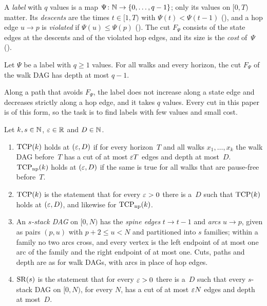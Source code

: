 A \emph{label} with $q$ values is a map $\Psi\colon\mathbb{N}\to\{0,\dots,q-1\}$; only its values on $[0,T)$ matter. Its
\emph{descents} are the times $t\in[1,T)$ with $\Psi(t)<\Psi(t-1)$ (), and a hop edge
$u\to p$ is \emph{violated} if $\Psi(u)\le\Psi(p)$ (). The cut $F_\Psi$ consists of the state
edges at the descents and of the violated hop edges, and its size is the \emph{cost} of~$\Psi$ ().

\begin{proposition}\label{prop:labelcut}
Let $\Psi$ be a label with $q\ge1$ values. For all walks and every horizon, the cut $F_\Psi$ of the walk DAG has depth at
most $q-1$.
\end{proposition}

Along a path that avoids $F_\Psi$, the label does not increase along a state edge and decreases strictly along a hop edge,
and it takes $q$ values. Every cut in this paper is of this form, so the task is to find labels with few values and small
cost.

\begin{definition}\label{def:tcp}
Let $k,s\in\mathbb{N}$, $\varepsilon\in\mathbb{R}$ and $D\in\mathbb{N}$.
\begin{enumerate}[label=(\alph*)]
\item $\mathrm{TCP}(k)$ holds at $(\varepsilon,D)$ if for every horizon~$T$ and all walks $x_1,\dots,x_k$ the walk DAG before~$T$ has a cut
of at most $\varepsilon T$ edges and depth at most~$D$. $\mathrm{TCP}_{\mathrm{np}}(k)$ holds at $(\varepsilon,D)$ if the same is true for all
walks that are pause-free before~$T$.
\item $\mathrm{TCP}(k)$ is the statement that for every $\varepsilon>0$ there is a~$D$ such that $\mathrm{TCP}(k)$ holds at $(\varepsilon,D)$, and
likewise for $\mathrm{TCP}_{\mathrm{np}}(k)$.
\item An \emph{$s$-stack DAG} on $[0,N)$ has the \emph{spine edges} $t\to t-1$ and \emph{arcs} $u\to p$, given as pairs
$(p,u)$ with $p+2\le u<N$ and partitioned into $s$ families; within a family no two arcs cross, and every vertex is the left
endpoint of at most one arc of the family and the right endpoint of at most one. Cuts, paths and depth are as for walk DAGs,
with arcs in place of hop edges.
\item $\mathrm{SR}(s)$ is the statement that for every $\varepsilon>0$ there is a~$D$ such that every $s$-stack DAG on $[0,N)$, for every
$N$, has a cut of at most $\varepsilon N$ edges and depth at most~$D$.
\end{enumerate}
\end{definition}

